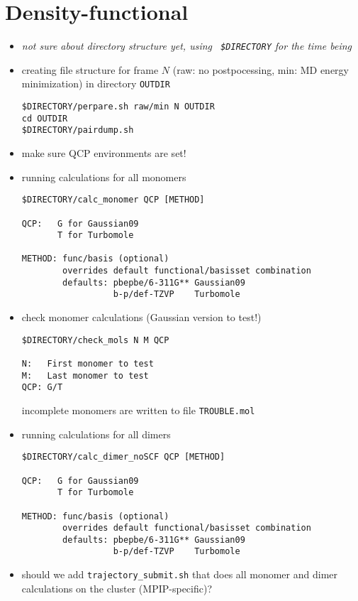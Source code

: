 \section{Density-functional}
\begin{itemize}
\item {\it not sure about directory structure yet, using {\tt
      \$DIRECTORY} for the time being}
\item creating file structure for frame $N$ (raw: no postpocessing,
  min: MD energy minimization) in directory {\tt OUTDIR}
\begin{verbatim}
$DIRECTORY/perpare.sh raw/min N OUTDIR
cd OUTDIR
$DIRECTORY/pairdump.sh
\end{verbatim}
\item make sure QCP environments are set!
\item running calculations for all monomers
 \begin{verbatim}
$DIRECTORY/calc_monomer QCP [METHOD]

QCP:   G for Gaussian09
       T for Turbomole

METHOD: func/basis (optional)
        overrides default functional/basisset combination
        defaults: pbepbe/6-311G** Gaussian09
                  b-p/def-TZVP    Turbomole
\end{verbatim}
\item check monomer calculations (Gaussian version to test!) 
\begin{verbatim}
$DIRECTORY/check_mols N M QCP

N:   First monomer to test
M:   Last monomer to test
QCP: G/T 
\end{verbatim}
incomplete monomers are written to file {\tt TROUBLE.mol}
\item running calculations for all dimers
 \begin{verbatim}
$DIRECTORY/calc_dimer_noSCF QCP [METHOD]

QCP:   G for Gaussian09
       T for Turbomole

METHOD: func/basis (optional)
        overrides default functional/basisset combination
        defaults: pbepbe/6-311G** Gaussian09
                  b-p/def-TZVP    Turbomole
\end{verbatim}
\item should we add {\tt trajectory\_submit.sh} that does all monomer
  and dimer calculations on the cluster (MPIP-specific)?
\end{itemize}
